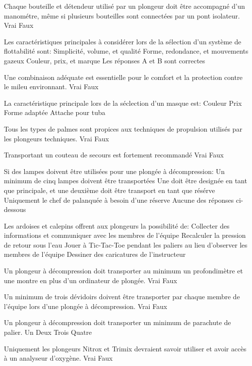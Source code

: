\documentclass[english,12pt,a4paper]{article}
\begin{document}
\begin{outline}
		\1 Chaque bouteille et détendeur utilisé par un plongeur doit être accompagné d'un manométre, même si plusieurs bouteilles sont connectées par un pont isolateur.
			\2 Vrai
			\2 Faux

		\1 Les caractéristiques principales à considérer lors de la sélection d'un système de flottabilité sont:
			\2 Simplicité, volume, et qualité
			\2 Forme, redondance, et mouvements gazeux
			\2 Couleur, prix, et marque
			\2 Les réponses A et B sont correctes

		\1 Une combinaison adéquate est essentielle pour le comfort et la protection contre le mileu environnant.
			\2 Vrai
			\2 Faux

		\1 La caractéristique principale lors de la séclection d'un masque est:
			\2 Couleur
			\2 Prix
			\2 Forme adaptée
			\2 Attache pour tuba

		\1 Tous les types de palmes sont propices aux techniques de propulsion utilisés par les plongeurs techniques.
			\2 Vrai
			\2 Faux

		\1 Transportant un couteau de secours est fortement recommandé
			\2 Vrai
			\2 Faux

		\1 Si des lampes doivent être utilisées pour une plongée à décompression:
			\2 Un minimum de cinq lampes doivent être transportées
			\2 Une doit être designée en tant que principale, et une deuxième doit être transport en tant que résérve
			\2 Uniquement le chef de palanquée à besoin d'une réserve
			\2 Aucune des réponses ci-dessous

		\1 Les ardoises et calepins offrent aux plongeurs la possibilité de:
			\2 Collecter des informations et communiquer avec les membres de l'équipe
			\2 Recalculer la pression de retour sous l'eau
			\2 Jouer à Tic-Tac-Toe pendant les paliers au lieu d'observer les membres de l'équipe
			\2 Dessiner des caricatures de l'instructeur

		\1 Un plongeur à décompression doit transporter au minimum un profondimètre et une montre en plus d'un ordinateur de plongée.
			\2 Vrai
			\2 Faux

		\1 Un minimum de trois dévidoirs doivent être transporter par chaque membre de l'équipe lors d'une plongée à décompression.
			\2 Vrai
			\2 Faux

		\1 Un plongeur à décompression doit transporter un minimum de \underline{\hspace{1.5cm}} parachute de palier.
			\2 Un
			\2 Deux
			\2 Trois
			\2 Quatre

		\1 Uniquement les plongeurs Nitrox et Trimix devraient savoir utiliser et avoir accès à un analyseur d'oxygène.
			\2 Vrai
			\2 Faux


\end{outline}
\end{document}
